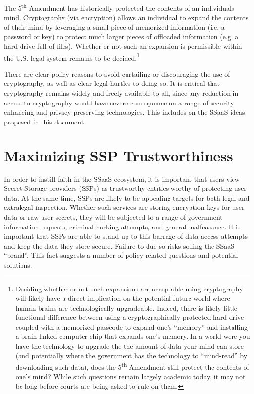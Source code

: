 The 5\textsuperscript{th} Amendment has historically protected the
contents of an individuals mind. Cryptography (via encryption) allows
an individual to expand the contents of their mind by leveraging a
small piece of memorized information (i.e. a password or key) to
protect much larger pieces of offloaded information (e.g. a hard drive
full of files). Whether or not such an expansion is permissible within
the U.S. legal system remains to be decided.\footnote{Deciding whether
  or not such expansions are acceptable using cryptography will likely
  have a direct implication on the potential future world where human
  brains are technologically upgradeable. Indeed, there is likely
  little functional difference between using a cryptographically
  protected hard drive coupled with a memorized passcode to expand
  one's ``memory'' and installing a brain-linked computer chip that
  expands one's memory. In a world were you have the technology to
  upgrade the the amount of data your mind can store (and potentially
  where the government has the technology to ``mind-read'' by
  downloading such data), does the 5\textsuperscript{th} Amendment
  still protect the contents of one's mind? While such questions
  remain largely academic today, it may not be long before courts are
  being asked to rule on them.}

There are clear policy reasons to avoid curtailing or discouraging the
use of cryptography, as well as clear legal hurtles to doing so. It is
critical that cryptography remains widely and freely available to all,
since any reduction in access to cryptography would have severe
consequence on a range of security enhancing and privacy preserving
technologies. This includes on the SSaaS ideas proposed in this
document.

\section{Maximizing SSP Trustworthiness}

In order to instill faith in the SSaaS ecosystem, it is important that
users view Secret Storage providers (SSPs) as trustworthy entities
worthy of protecting user data. At the same time, SSPs are likely to
be appealing targets for both legal and extralegal inspection.
Whether such services are storing encryption keys for user data or raw
user secrets, they will be subjected to a range of government
information requests, criminal hacking attempts, and general
malfeasance. It is important that SSPs are able to stand up to this
barrage of data access attempts and keep the data they store
secure. Failure to due so risks soiling the SSaaS ``brand''. This fact
suggests a number of policy-related questions and potential solutions.

